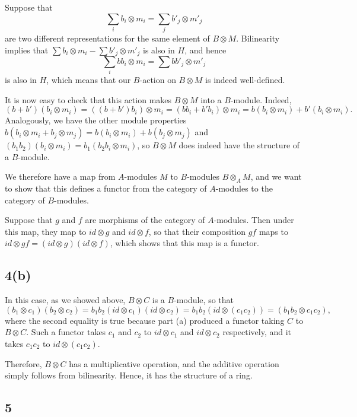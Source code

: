\documentclass[12pt, reqno]{amsart}
\begin{document}
Suppose that 
\[ 
\sum_i b_i \otimes m_i = \sum_j b'_j \otimes m'_j
\] 
are two different representations for the same element of $B \otimes M$.
Bilinearity implies that $\sum b_i \otimes m_i - \sum b'_j \otimes m'_j$ 
is also in $H$, and hence
\[ 
\sum_i bb_i \otimes m_i = \sum bb'_j \otimes m'_j
\] 
is also in $H$, which means that our $B$-action on $B \otimes M$ is indeed
well-defined.

It is now easy to check that this action makes $B \otimes M$ into a $B$-module.
Indeed, 
\[ 
(b + b')(b_i \otimes m_i) 
= ((b + b')b_i) \otimes m_i
= (b b_i + b' b_i) \otimes m_i
= b (b_i \otimes m_i) + b' (b_i \otimes m_i).
\] 
Analogously, we have the other module properties
$b (b_i \otimes m_i + b_j \otimes m_j) 
= b (b_i \otimes m_i) + b (b_j \otimes m_j)$ and 
$(b_1 b_2) (b_i \otimes m_i) = b_1 (b_2 b_i \otimes m_i)$, 
so $B \otimes M$ does indeed have the structure of a $B$-module.

We therefore have a map from $A$-modules $M$ to $B$-modules $B \otimes_A M$, 
and we want to show that this defines a functor from the category
of $A$-modules to the category of $B$-modules.

Suppose that $g$ and $f$ are morphisms of the category of $A$-modules. Then 
under this map, they map to $id \otimes g$ and $id \otimes f$, so that
their composition $gf$ maps to 
$id \otimes gf = (id \otimes g) (id \otimes f)$, which shows that this map is a
functor.


\subsection*{4(b)}

In this case, as we showed above, $B \otimes C$ is a $B$-module, so that
$$
(b_1 \otimes c_1)(b_2 \otimes c_2) 
= b_1 b_2 (id \otimes c_1) (id \otimes c_2)
= b_1 b_2 (id \otimes (c_1 c_2)) = (b_1 b_2 \otimes c_1 c_2),
$$
where the second equality is true because part (a) produced a functor taking 
$C$ to $B \otimes C$. Such a functor takes $c_1$ and $c_2$ to $id \otimes c_1$
and $id \otimes c_2$ respectively, 
and it takes $c_1 c_2$ to $id \otimes (c_1 c_2)$.

Therefore, $B \otimes C$ has a multiplicative operation, and the
additive operation simply follows from bilinearity. Hence, it has the 
structure of a ring.


\subsection*{5}
\end{document}

